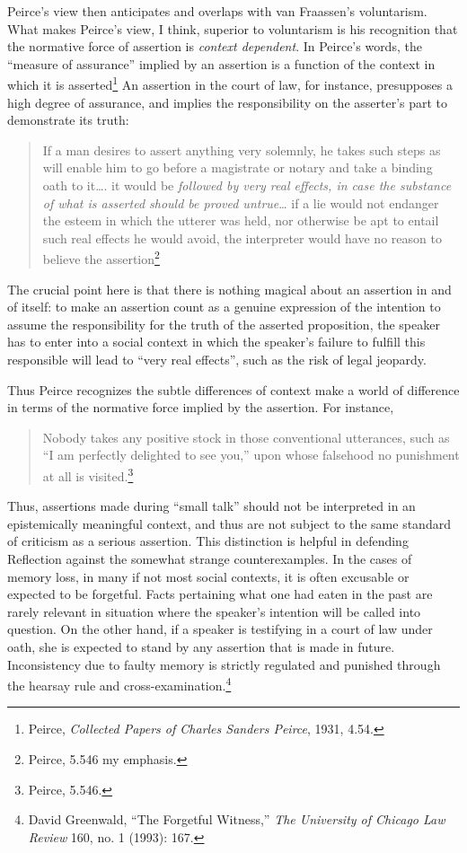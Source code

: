 Peirce's view then anticipates and overlaps with van Fraassen's
voluntarism. What makes Peirce's view, I think, superior to voluntarism
is his recognition that the normative force of assertion is
\emph{context dependent}. In Peirce's words, the ``measure of
assurance'' implied by an assertion is a function of the context in
which it is asserted\footnote{Peirce, \emph{Collected Papers of Charles
  Sanders Peirce}, 1931, 4.54.} An assertion in the court of law, for
instance, presupposes a high degree of assurance, and implies the
responsibility on the asserter's part to demonstrate its truth:

\begin{quote}
If a man desires to assert anything very solemnly, he takes such steps
as will enable him to go before a magistrate or notary and take a
binding oath to it\ldots{}. it would be \emph{followed by very real
effects, in case the substance of what is asserted should be proved
untrue}\ldots{} if a lie would not endanger the esteem in which the
utterer was held, nor otherwise be apt to entail such real effects he
would avoid, the interpreter would have no reason to believe the
assertion\footnote{Peirce, 5.546 my emphasis.}
\end{quote}

The crucial point here is that there is nothing magical about an
assertion in and of itself: to make an assertion count as a genuine
expression of the intention to assume the responsibility for the truth
of the asserted proposition, the speaker has to enter into a social
context in which the speaker's failure to fulfill this responsible will
lead to ``very real effects'', such as the risk of legal jeopardy.

Thus Peirce recognizes the subtle differences of context make a world of
difference in terms of the normative force implied by the assertion. For
instance,

\begin{quote}
Nobody takes any positive stock in those conventional utterances, such
as ``I am perfectly delighted to see you,'' upon whose falsehood no
punishment at all is visited.\footnote{Peirce, 5.546.}
\end{quote}

Thus, assertions made during ``small talk'' should not be interpreted in
an epistemically meaningful context, and thus are not subject to the
same standard of criticism as a serious assertion. This distinction is
helpful in defending Reflection against the somewhat strange
counterexamples. In the cases of memory loss, in many if not most social
contexts, it is often excusable or expected to be forgetful. Facts
pertaining what one had eaten in the past are rarely relevant in
situation where the speaker's intention will be called into question. On
the other hand, if a speaker is testifying in a court of law under oath,
she is expected to stand by any assertion that is made in future.
Inconsistency due to faulty memory is strictly regulated and punished
through the hearsay rule and cross-examination.\footnote{David
  Greenwald, ``The Forgetful Witness,'' \emph{The University of Chicago
  Law Review} 160, no. 1 (1993): 167.}

